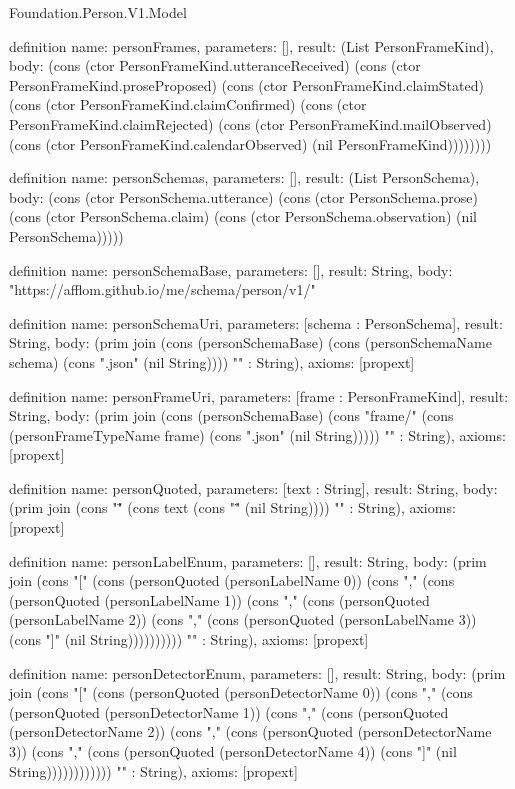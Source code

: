 \begin{lexlean}{Foundation.Person.V1.Model}
\begin{semanticmodule}
definition{
  name: personFrames,
  parameters: [],
  result: (List PersonFrameKind),
  body: (cons (ctor PersonFrameKind.utteranceReceived) (cons (ctor PersonFrameKind.proseProposed) (cons (ctor PersonFrameKind.claimStated) (cons (ctor PersonFrameKind.claimConfirmed) (cons (ctor PersonFrameKind.claimRejected) (cons (ctor PersonFrameKind.mailObserved) (cons (ctor PersonFrameKind.calendarObserved) (nil PersonFrameKind))))))))
}

definition{
  name: personSchemas,
  parameters: [],
  result: (List PersonSchema),
  body: (cons (ctor PersonSchema.utterance) (cons (ctor PersonSchema.prose) (cons (ctor PersonSchema.claim) (cons (ctor PersonSchema.observation) (nil PersonSchema)))))
}

definition{
  name: personSchemaBase,
  parameters: [],
  result: String,
  body: "https://afflom.github.io/me/schema/person/v1/"
}

definition{
  name: personSchemaUri,
  parameters: [schema : PersonSchema],
  result: String,
  body: (prim join (cons (personSchemaBase) (cons (personSchemaName schema) (cons ".json" (nil String)))) "" : String),
  axioms: [propext]
}

definition{
  name: personFrameUri,
  parameters: [frame : PersonFrameKind],
  result: String,
  body: (prim join (cons (personSchemaBase) (cons "frame/" (cons (personFrameTypeName frame) (cons ".json" (nil String))))) "" : String),
  axioms: [propext]
}

definition{
  name: personQuoted,
  parameters: [text : String],
  result: String,
  body: (prim join (cons "\"" (cons text (cons "\"" (nil String)))) "" : String),
  axioms: [propext]
}

definition{
  name: personLabelEnum,
  parameters: [],
  result: String,
  body: (prim join (cons "[" (cons (personQuoted (personLabelName 0)) (cons "," (cons (personQuoted (personLabelName 1)) (cons "," (cons (personQuoted (personLabelName 2)) (cons "," (cons (personQuoted (personLabelName 3)) (cons "]" (nil String)))))))))) "" : String),
  axioms: [propext]
}

definition{
  name: personDetectorEnum,
  parameters: [],
  result: String,
  body: (prim join (cons "[" (cons (personQuoted (personDetectorName 0)) (cons "," (cons (personQuoted (personDetectorName 1)) (cons "," (cons (personQuoted (personDetectorName 2)) (cons "," (cons (personQuoted (personDetectorName 3)) (cons "," (cons (personQuoted (personDetectorName 4)) (cons "]" (nil String)))))))))))) "" : String),
  axioms: [propext]
}


\end{semanticmodule}
\end{lexlean}
